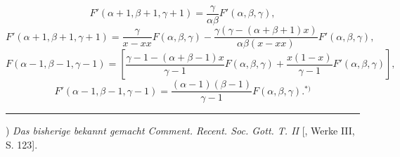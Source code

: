 \begin{equation}
F'(\alpha+1,\beta+1,\gamma+1)=\frac{\gamma}{\alpha\beta}F'(\alpha,\beta,\gamma),\tag*{(26)}
\end{equation}
\begin{equation}
F'(\alpha+1,\beta+1,\gamma+1)=\frac{\gamma}{x-xx}F(\alpha,\beta,\gamma)-\frac{\gamma(\gamma-(\alpha+\beta+1)x)}{\alpha\beta(x-xx)}F'(\alpha,\beta,\gamma),\tag*{(27)}
\end{equation}
\begin{equation}
F(\alpha-1,\beta-1,\gamma-1)=\left[\frac{\gamma-1-(\alpha+\beta-1)x}{\gamma-1}F(\alpha,\beta,\gamma)+\frac{x(1-x)}{\gamma-1}F'(\alpha,\beta,\gamma)\right],\tag*{(28)}
\end{equation}
\begin{equation}
F'(\alpha-1,\beta-1,\gamma-1)=\frac{(\alpha-1)(\beta-1)}{\gamma-1}F(\alpha,\beta,\gamma).{}^{\text{*)}}\tag*{(29)}
\end{equation}
\par{}\bigskip\noindent\rule{.25\linewidth}{.4pt}\par\smallskip
{\small\par\indent *) \textit{Das bisherige bekannt gemacht Comment. Recent. Soc. Gott. T. II} [, Werke III, S. 123].\par}
\clearpage
\endgroup

